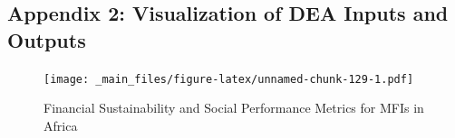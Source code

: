 \documentclass[a4paper, nobind]{templates/ociamthesis}
\begin{document}
\begin{landscape}

\hypertarget{appendix-2-visualization-of-dea-inputs-and-outputs}{%
\subsection{Appendix 2: Visualization of DEA Inputs and Outputs}\label{appendix-2-visualization-of-dea-inputs-and-outputs}}

\begin{figure}
\centering
\texttt{[image: \_main\_files/figure-latex/unnamed-chunk-129-1.pdf]}
\caption{\label{fig:unnamed-chunk-129}Financial Sustainability and Social Performance Metrics for MFIs in Africa}
\end{figure}

\end{landscape}
\end{document}
